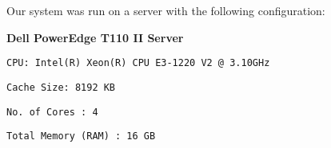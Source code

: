 Our system was run on a server with the following configuration:

\textbf{Dell PowerEdge T110 II Server}

\texttt{CPU: Intel(R) Xeon(R) CPU E3-1220 V2 @ 3.10GHz}

\texttt{Cache Size: 8192 KB}

\texttt{No. of Cores : 4}

\texttt{Total Memory (RAM) : 16 GB}